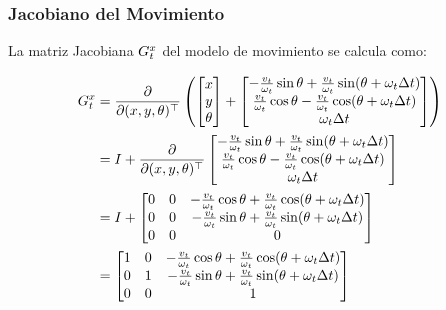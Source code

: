 \begin{frame}
    \frametitle{Jacobiano del Movimiento}
    
    La matriz Jacobiana $G_{t}^{x}$ del modelo de movimiento se calcula como:
    
    \begin{align*}
        G_{t}^{x} &= \frac{\partial}{\partial(x, y, \theta)^{\top}} \left(
        \begin{bmatrix}
        x \\
        y \\
        \theta
        \end{bmatrix}
        +
        \begin{bmatrix}
        -\frac{v_t}{\omega_t} \sin \theta + \frac{v_t}{\omega_t} \sin(\theta + \omega_t \Delta t) \\
        \frac{v_t}{\omega_t} \cos \theta - \frac{v_t}{\omega_t} \cos(\theta + \omega_t \Delta t) \\
        \omega_t \Delta t
        \end{bmatrix}
        \right) \\
        &= I + \frac{\partial}{\partial(x, y, \theta)^{\top}} 
        \begin{bmatrix}
        -\frac{v_t}{\omega_t} \sin \theta + \frac{v_t}{\omega_t} \sin(\theta + \omega_t \Delta t) \\
        \frac{v_t}{\omega_t} \cos \theta - \frac{v_t}{\omega_t} \cos(\theta + \omega_t \Delta t) \\
        \omega_t \Delta t
        \end{bmatrix} \\
        &= I + 
        \begin{bmatrix}
        0 & 0 & -\frac{v_t}{\omega_t} \cos \theta + \frac{v_t}{\omega_t} \cos(\theta + \omega_t \Delta t) \\
        0 & 0 & -\frac{v_t}{\omega_t} \sin \theta + \frac{v_t}{\omega_t} \sin(\theta + \omega_t \Delta t) \\
        0 & 0 & 0
        \end{bmatrix} \\
        &= 
        \begin{bmatrix}
        1 & 0 & -\frac{v_t}{\omega_t} \cos \theta + \frac{v_t}{\omega_t} \cos(\theta + \omega_t \Delta t) \\
        0 & 1 & -\frac{v_t}{\omega_t} \sin \theta + \frac{v_t}{\omega_t} \sin(\theta + \omega_t \Delta t) \\
        0 & 0 & 1
        \end{bmatrix}
    \end{align*}
    
\end{frame}

